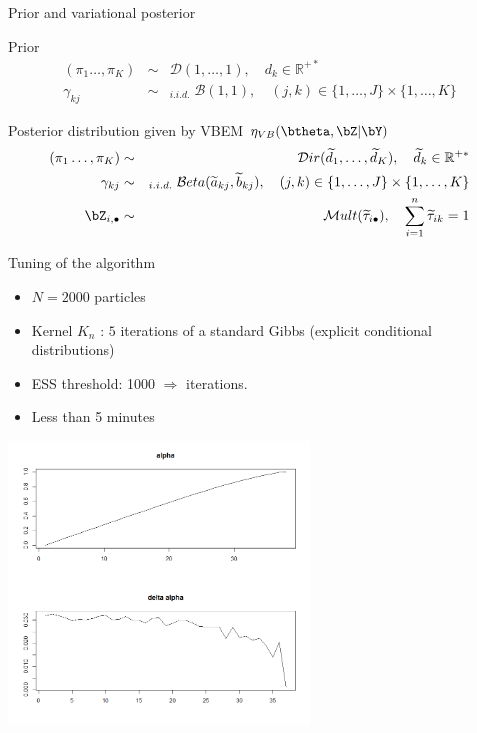 \begin{frame}{Prior and variational posterior}
\begin{block}{Prior}
\begin{eqnarray*}
(\pi_1\dots,\pi_K) &\sim& \mathcal{D}(1,\dots,1),\quad d_k \in \mathbb{R}^{+*}\\
\gamma_{kj} &\sim&_{i.i.d.} \; \mathcal{B}(1,1),\quad (j,k) \in\{1,\dots,J\} \times \{1,\dots,K\}
\end{eqnarray*}
\end{block}

\begin{block}{Posterior distribution given by VBEM $\eta_{VB}(\btheta,\bZ | \bY)$} 
\begin{eqnarray*}
(\pi_1\dots,\pi_K) &\sim& \mathcal{D}ir(\widetilde{d}_1,\dots,\widetilde{d}_K),\quad \widetilde{d}_k \in \mathbb{R}^{+*}\\
\gamma_{kj} &\sim&_{i.i.d.} \; \mathcal{B}eta(\widetilde{a}_{kj},\widetilde{b}_{kj}),\quad (j,k) \in\{1,\dots,J\} \times \{1,\dots,K\}\\
\bZ_{i,\bullet} &\sim& \mathcal{M}ult(\widetilde{\tau}_{i\bullet}), \quad \sum_{i=1}^n \widetilde{\tau}_{ik} = 1
\end{eqnarray*}
\end{block}
\end{frame}

\begin{frame}{Tuning of the algorithm}

\begin{itemize}
\item $N=2000$ particles

\item Kernel $K_n$ : $5$ iterations of a standard Gibbs (explicit conditional distributions)
\item ESS threshold: 1000  \vert $\Rightarrow$  iterations. 
\item Less than 5 minutes
\end{itemize}

\centering
 \includegraphics[width=0.6\textwidth]{figures/traj_alpha_example.png}
\end{frame}

